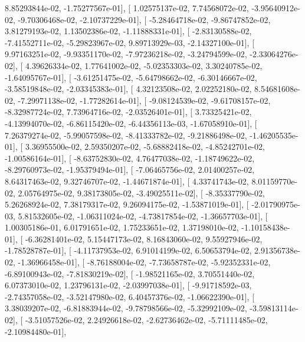 \documentclass{article}
\begin{document}
          8.85293844e-02,  -1.75277567e-01],
       [  1.02575137e-02,   7.74568072e-02,  -3.95640912e-02,
         -9.70306468e-02,  -2.10737229e-01],
       [ -5.28464718e-02,  -9.86747852e-02,   3.81279193e-02,
          1.13502386e-02,  -1.11888331e-01],
       [ -2.83130588e-02,  -7.41552711e-02,  -5.29823967e-02,
          9.89713929e-03,  -2.14327100e-01],
       [  9.97163251e-02,  -9.93351170e-02,  -7.97236218e-02,
         -3.24794599e-02,  -2.33064276e-02],
       [  4.39626334e-02,   1.77641002e-02,  -5.02353303e-02,
          3.30240785e-02,  -1.64095767e-01],
       [ -3.61251475e-02,  -5.64798662e-02,  -6.30146667e-02,
         -3.58519848e-02,  -2.03345383e-01],
       [  4.32123508e-02,   2.02252180e-02,   8.54681608e-02,
         -7.29971138e-02,  -1.77282614e-01],
       [ -9.08124539e-02,  -9.61708157e-02,  -8.32987724e-02,
          7.73964716e-02,  -2.03526401e-01],
       [  3.73325421e-02,  -4.13994070e-02,  -6.86115420e-02,
         -6.44356113e-03,  -1.67058910e-01],
       [  7.26379274e-02,  -5.99057598e-02,  -8.41333782e-02,
         -9.21886498e-02,  -1.46205535e-01],
       [  3.36955500e-02,   2.59350207e-02,  -5.68882418e-02,
         -4.85242701e-02,  -1.00586164e-01],
       [ -8.63752830e-02,   4.76477038e-02,  -1.18749622e-02,
         -8.29760973e-02,  -1.95379494e-01],
       [ -7.06465756e-02,   2.01400257e-02,   8.64317463e-02,
          9.32746707e-02,  -1.44671874e-01],
       [  4.33741743e-02,   8.01159770e-02,   2.05764975e-02,
          9.38173805e-02,  -3.49025511e-02],
       [ -8.35337790e-02,   5.26268924e-02,   7.38179317e-02,
          9.26094175e-02,  -1.53871019e-01],
       [ -2.01790975e-03,   5.81532605e-02,  -1.06311024e-02,
         -4.73817854e-02,  -1.36657703e-01],
       [  1.00305186e-01,   6.01791651e-02,   1.75233651e-02,
          1.37198010e-02,  -1.10158438e-01],
       [ -6.36281401e-02,   5.15447173e-02,   8.16843060e-02,
          9.55927946e-02,  -1.78528787e-01],
       [ -4.11737953e-02,   6.91014199e-02,   6.50653794e-02,
          2.91356738e-02,  -1.36966458e-01],
       [ -8.76188004e-02,  -7.73658787e-02,  -5.92352331e-02,
         -6.89100943e-02,  -7.81830219e-02],
       [ -1.98521165e-02,   3.70551440e-02,   6.07373010e-02,
          1.23796131e-02,  -2.03997038e-01],
       [ -9.91718592e-03,  -2.74357058e-02,  -3.52147980e-02,
          6.40457376e-02,  -1.06622390e-01],
       [  3.38039207e-02,  -6.81883944e-02,  -9.78798566e-02,
         -5.32992109e-02,  -3.59813114e-02],
       [ -3.51057526e-02,   2.24926618e-02,  -2.62736462e-02,
         -5.71111485e-02,  -2.10984480e-01],
\end{document}
